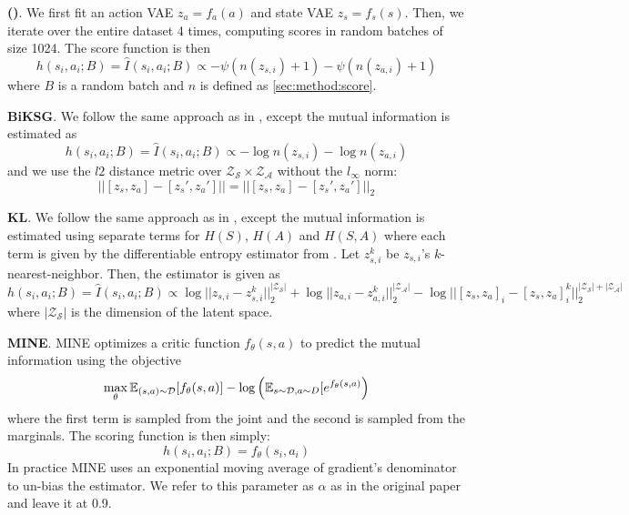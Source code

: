 \vspace{0.075in}

\noindent \textbf{\fullname (\abv)}. We first fit an action VAE $z_a = f_a(a)$ and state VAE $z_s = f_s(s)$. Then, we iterate over the entire dataset 4 times, computing scores in random batches of size 1024. The score function is then
\begin{equation*}
        h(s_i, a_i; B) = \hat{I}(s_i, a_i ; B) \propto -\psi(n(z_{s,i}) + 1) - \psi(n(z_{a,i}) + 1)
\end{equation*}
where $B$ is a random batch and $n$ is defined as \cref{sec:method:score}.

\vspace{0.075in}
\noindent \textbf{BiKSG}. We follow the same approach as in \abv, except the mutual information is estimated as
\begin{equation*}
        h(s_i, a_i; B) = \hat{I}(s_i, a_i ; B) \propto -\log n(z_{s,i}) - \log n(z_{a,i})
\end{equation*}
and we use the $l2$ distance metric over $\mathcal{Z}_\mathcal{S} \times \mathcal{Z}_\mathcal{A}$ without the $l_\infty$ norm:
\begin{equation*}
    ||[z_s, z_a] - [z_s', z_a'] || = ||[z_s, z_a] - [z_s', z_a'] ||_2
\end{equation*}

\vspace{0.075in}
\noindent \textbf{KL}. We follow the same approach as in \abv, except the mutual information is estimated using separate terms for $H(S)$, $H(A)$ and $H(S, A)$ where each term is given by the differentiable entropy estimator from \citet{kozachenko1987sample}. Let $z^k_{s,i}$ be $z_{s,i}$'s $k$-nearest-neighbor. Then, the estimator is given as
\begin{equation*}
        h(s_i, a_i; B) = \hat{I}(s_i, a_i ; B) \propto \log ||z_{s,i} - z^k_{s,i}||_2^{|\mathcal{Z}_\mathcal{S}|} + \log ||z_{a,i} - z^k_{a,i}||_2^{|\mathcal{Z}_\mathcal{A}|} - \log ||[z_s, z_a]_{i} - [z_s, z_a]^k_{i}||_2^{|\mathcal{Z}_\mathcal{S}| + |\mathcal{Z}_\mathcal{A}|}
\end{equation*}
where $|\mathcal{Z}_\mathcal{S}|$ is the dimension of the latent space.

\vspace{0.075in}
\noindent \textbf{MINE}. MINE optimizes a critic function $f_\theta(s,a)$ to predict the mutual information using the objective
\begin{equation*}
    \max_\theta \mathbb{E}_{(s,a)\sim \mathcal{D}}[f_\theta(s,a)] - \log \left(\mathbb{E}_{s \sim \mathcal{D}, a \sim D}[e^{f_\theta(s,a)}\right)
\end{equation*}
where the first term is sampled from the joint and the second is sampled from the marginals. The scoring function is then simply:
\begin{equation*}
    h(s_i, a_i; B) = f_\theta(s_i, a_i)
\end{equation*}
In practice MINE uses an exponential moving average of gradient's denominator to un-bias the estimator. We refer to this parameter as $\alpha$ as in the original paper and leave it at 0.9.

